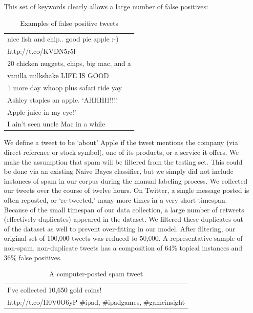 \documentclass[letterpaper]{article}
\begin{document}
This set of keywords clearly allows a large number of false positives:

\begin{table}[ht]
\centering
\begin{tabular}{|l|}
	\hline
	nice fish and chip.. good pie apple :-) \\ http://t.co/KVDN5r5l \\ \hline
	20 chicken nuggets, chips, big mac, and a \\ vanilla milkshake LIFE IS GOOD \\ \hline
	1 more day whoop plus safari ride yay \\ \hline
	Ashley staples an apple.  `AHHHH!!!! \\ Apple juice in my eye!' \\ \hline
	I ain't seen uncle Mac in a while \\
	\hline
\end{tabular}
\caption{Examples of false positive tweets}
\label{tab:myfirsttable}
\end{table}


We define a tweet to be `about' Apple if the tweet mentions the company (via direct reference or stock symbol), one of its products, or a service it offers. We make the assumption that spam will be filtered from the testing set. This could be done via an existing Naive Bayes classifier, %
 but we simply did not include instances of spam in our corpus during the manual labeling process. We collected our tweets over the course of twelve hours. On Twitter, a single message posted is often reposted, or `re-tweeted,' many more times in a very short timespan. Because of the small timespan of our data collection, a large number of retweets (effectively duplicates) appeared in the dataset. We filtered these duplicates out of the dataset as well to prevent over-fitting in our model. After filtering, our original set of 100,000 tweets was reduced to 50,000. A representative sample of non-spam, non-duplicate tweets has a composition of 64\% topical instances and 36\% false positives.

\begin{table}[h]
\centering
\begin{tabular}{|l|}
	\hline
	I've collected 10,650 gold coins! \\ http://t.co/H0V0O6yP \#ipad, \#ipadgames, \#gameinsight\\
	\hline
\end{tabular}
\caption{A computer-posted spam tweet}
\end{table}
\end{document}
